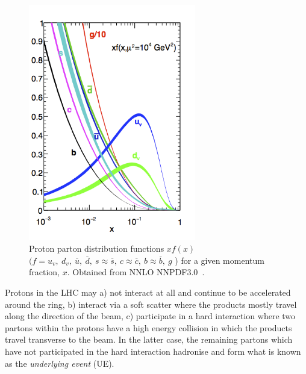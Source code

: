 \begin{figure}[ht!]
\begin{center}
    \includegraphics[width=0.65\textwidth]{images/Theory/pdfnob.png}
    \caption{Proton parton distribution functions $xf(x)$ $(f = u_{v},~ d_{v},~ \overline{u},~ \overline{d},~ s\approx\overline{s},~ c\approx\overline{c},~ b\approx\overline{b},~ g$ ) for a given momentum fraction, $x$. Obtained from NNLO NNPDF3.0~\cite{Ball2015}.}
    \label{fig:protonPDF}
\end{center}
\end{figure}

Protons in the LHC may a) not interact at all and continue to be accelerated around the ring, b) interact via a soft scatter where the products mostly travel along the direction of the beam, c) participate in a hard interaction where two partons within the protons have a high energy collision in which the products travel transverse to the beam. In the latter case, the remaining partons which have not participated in the hard interaction hadronise and form what is known as the \emph{underlying event} (UE).

